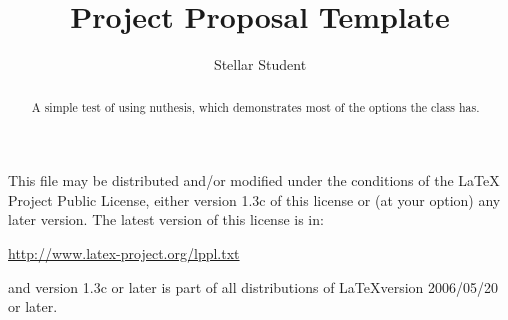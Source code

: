 \documentclass[ms,twoside,print]{nuthesis}
\theoremstyle{definition}
\begin{document}
\frontmatter

\title{Project Proposal Template}
\author{Stellar Student}
\maketitle
\begin{abstract}
  A simple test of using \textsf{nuthesis}, which demonstrates most
  of the options the class has.
\end{abstract}

\begin{copyrightpage}
This file may be distributed and/or modified under the conditions of
the \LaTeX{} Project Public License, either version 1.3c of this license
or (at your option) any later version.  The latest version of this
license is in:
\begin{center}
   \url{http://www.latex-project.org/lppl.txt}
\end{center}
and version 1.3c or later is part of all distributions of \LaTeX version
2006/05/20 or later.
\end{copyrightpage}


\end{document}
